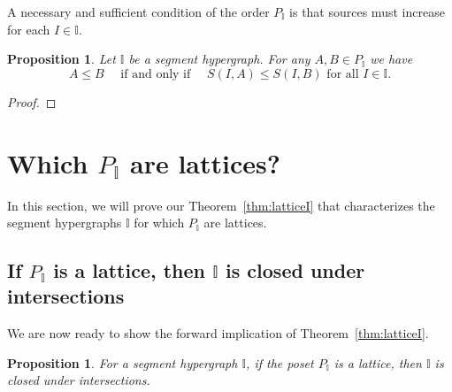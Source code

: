 \documentclass[reqno]{amsart}
\newtheorem{proposition}[theorem]{Proposition}
\theoremstyle{definition}
\newcommand{\II}{\mathbb I} %
\begin{document}
A necessary and sufficient  condition of the order $P_\II$ is that sources must increase for each $I\in \II$.

\begin{proposition}
\label{prop:sourceorder}
Let $\II$ be a segment hypergraph. For any $A,B\in P_\II$ we have
$$ A\le B\quad  \text{ if and only if }\quad  S(I,A)\le S(I,B) \text{ for all } I\in \II .$$
\end{proposition}
\begin{proof}

\end{proof}



\section{Which $P_\II$ are lattices?}
\label{sec:LatticePI}

In this section, we will prove our Theorem~\ref{thm:latticeI} that characterizes the segment hypergraphs $\II$ for which $P_\II$ are lattices.

\subsection{If $P_\II$ is a lattice, then $\II$ is closed under intersections}  
\label{subsec:latticeI}

We are now ready to show the forward implication of Theorem~\ref{thm:latticeI}.

\begin{proposition}
	For a segment hypergraph $\II$, if the poset $P_\II$ is a lattice, then $\II$ is closed under intersections.
\end{proposition}
\end{document}
